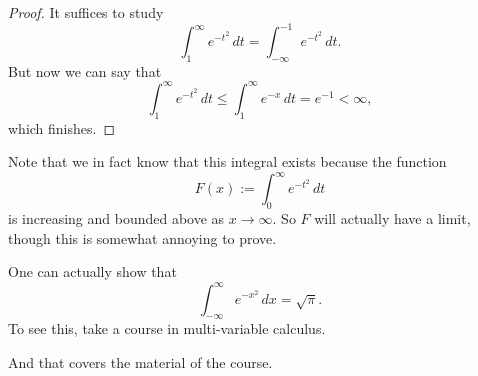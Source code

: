 \begin{proof}
	It suffices to study
	\[\int_1^\infty e^{-t^2}\,dt=\int_{-\infty}^{-1}e^{-t^2}\,dt.\]
	But now we can say that
	\[\int_1^\infty e^{-t^2}\,dt\le\int_1^\infty e^{-x}\,dt=e^{-1}<\infty,\]
	which finishes.
\end{proof}
\begin{remark}
	Note that we in fact know that this integral exists because the function
	\[F(x):=\int_0^\infty e^{-t^2}\,dt\]
	is increasing and bounded above as $x\to\infty.$ So $F$ will actually have a limit, though this is somewhat annoying to prove.
\end{remark}
\begin{remark}
	One can actually show that
	\[\int_{-\infty}^\infty e^{-x^2}\,dx=\sqrt\pi.\]
	To see this, take a course in multi-variable calculus.
\end{remark}
And that covers the material of the course.